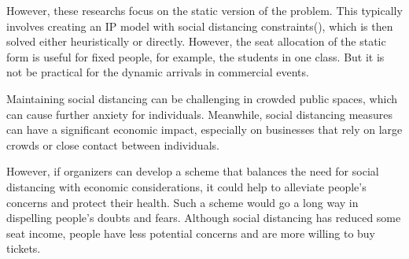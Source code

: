



However, these researchs focus on the static version of the problem. This typically involves creating an IP model with social distancing constraints(\cite{bortolete2022support, ghorbani2020model, haque2022optimization}), which is then solved either heuristically or directly. However, the seat allocation of the static form is useful for fixed people, for example, the students in one class. 
But it is not be practical for the dynamic arrivals in commercial events.



Maintaining social distancing can be challenging in crowded public spaces, which can cause further anxiety for individuals. Meanwhile, social distancing measures can have a significant economic impact, especially on businesses that rely on large crowds or close contact between individuals.

However, if organizers can develop a scheme that balances the need for social distancing with economic considerations, it could help to alleviate people's concerns and protect their health. Such a scheme would go a long way in dispelling people's doubts and fears. Although social distancing has reduced some seat income, people have less potential concerns and are more willing to buy tickets.

